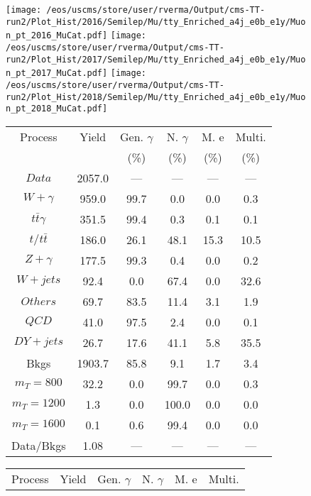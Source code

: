 \begin{figure}
\centering
\texttt{[image: /eos/uscms/store/user/rverma/Output/cms-TT-run2/Plot\_Hist/2016/Semilep/Mu/tty\_Enriched\_a4j\_e0b\_e1y/Muon\_pt\_2016\_MuCat.pdf]}
\texttt{[image: /eos/uscms/store/user/rverma/Output/cms-TT-run2/Plot\_Hist/2017/Semilep/Mu/tty\_Enriched\_a4j\_e0b\_e1y/Muon\_pt\_2017\_MuCat.pdf]}
\texttt{[image: /eos/uscms/store/user/rverma/Output/cms-TT-run2/Plot\_Hist/2018/Semilep/Mu/tty\_Enriched\_a4j\_e0b\_e1y/Muon\_pt\_2018\_MuCat.pdf]}
\begin{minipage}[c]{0.32\textwidth}
\centering
\tiny{
\begin{tabular}{cccccc}
\hline
Process & Yield & Gen. $\gamma$ & N. $\gamma$ & M. e & Multi. \\
 &  & (\%) & (\%) & (\%) & (\%)  \\
\hline
                                                                      $ Data $ &  2057.0 &  --- &  --- &  --- &  ---\\
$ W+\gamma $ &  959.0 &  99.7 &  0.0 &  0.0 &  0.3\\
$ t\bar{t}\gamma $ &  351.5 &  99.4 &  0.3 &  0.1 &  0.1\\
$ t/t\bar{t} $ &  186.0 &  26.1 &  48.1 &  15.3 &  10.5\\
$ Z+\gamma $ &  177.5 &  99.3 &  0.4 &  0.0 &  0.2\\
$ W+jets $ &  92.4 &  0.0 &  67.4 &  0.0 &  32.6\\
$ Others $ &  69.7 &  83.5 &  11.4 &  3.1 &  1.9\\
$ QCD $ &  41.0 &  97.5 &  2.4 &  0.0 &  0.1\\
$ DY+jets $ &  26.7 &  17.6 &  41.1 &  5.8 &  35.5\\
Bkgs &  1903.7 &  85.8 &  9.1 &  1.7 &  3.4\\
$ m_{T} = 800 $ &  32.2 &  0.0 &  99.7 &  0.0 &  0.3\\
$ m_{T} = 1200 $ &  1.3 &  0.0 &  100.0 &  0.0 &  0.0\\
$ m_{T} = 1600 $ &  0.1 &  0.6 &  99.4 &  0.0 &  0.0\\
Data/Bkgs &  1.08 &  --- &  --- &  --- &  ---\\
\hline
\end{tabular}
}
\end{minipage}
\begin{minipage}[c]{0.32\textwidth}
\centering
\tiny{
\begin{tabular}{cccccc}
\hline
Process & Yield & Gen. $\gamma$ & N. $\gamma$ & M. e & Multi. \\

\end{tabular}}
\end{minipage}
\end{figure}
